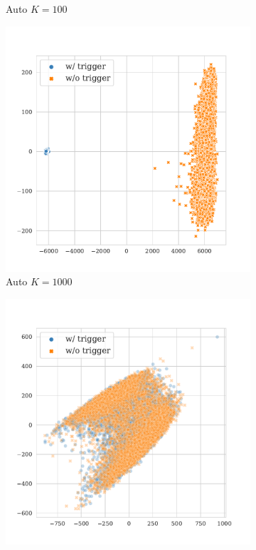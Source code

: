 \begin{figure}[!ht]
\begin{subfigure}{.33\textwidth}
  \caption{Auto $K = 100$}
  \label{fig:sst2_auto_k100_embed}
\end{subfigure}
\begin{subfigure}{.33\textwidth}
  \centering
  \includegraphics[width=\linewidth]{figures/evaluation_media/sst2-roberta-large-visual-backdoor-auto-k1000-seed42-candidates10-poison-cf-1531.pdf}
  \caption{Auto $K = 1000$}
  \label{fig:sst2_auto_k1000_embed}
\end{subfigure}
\begin{subfigure}{.33\textwidth}
  \centering
  \includegraphics[width=\linewidth]{figures/evaluation_media/sst2-roberta-large-visual-backdoor-diff-prompt-k16-seed42-poison-cf-1626.pdf}

\end{subfigure}
\end{figure}
